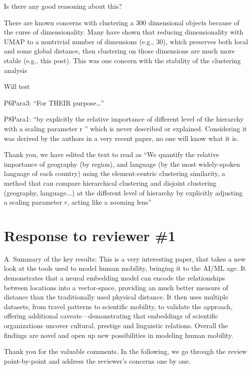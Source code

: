 \documentclass[12pt,a4paper]{article}
\newcommand{\response}[1]{{\leavevmode\noindent #1}}
\newcommand{\rcomment}[1]{%
\vspace{10pt}
\begin{tcolorbox}[colback=black!3,colframe=white!45!black]
#1
\end{tcolorbox}
}
\begin{document}
\response{
Is there any good reasoning about this?
}


\rcomment{
There are known concerns with clustering a 300 dimensional objects because of the curse of
dimensionality. Many have shown that reducing dimensionality with UMAP to a nontrivial
number of dimensions (e.g., 30), which preserves both local and some global distance, then
clustering on those dimensions are much more stable (e.g., this post). This was one
concern with the stability of the clustering analysis


}

\response{
Will test
}

\rcomment{
P6Para3: “For THEIR purpose…”
}

\response{
P8Para1: “by explicitly the relative importance of different level of the hierarchy with a scaling parameter r ” which is never described or explained. Considering it was derived by the authors in a very recent paper, no one will know what it is.
}

\rcomment{
Thank you, we have edited the text to read as “We quantify the relative importance of geography (by region), and language (by the most widely-spoken language of each country) using the element-centric clustering similarity, a method that can compare hierarchical clustering and disjoint clustering (geography, language...) at the different level of hierarchy by explicitly adjusting a scaling parameter $r$, acting like a zooming lens”
}



\section*{Response to reviewer \#1}

\rcomment{%
A. Summary of the key results:
This is a very interesting paper, that takes a new look at the tools used to model human mobility, bringing it to the AI/ML age. It demonstrates that a neural embedding model can encode the relationships between locations into a vector-space, providing an much better measure of distance than the traditionally used physical distance. It then uses multiple datasets, from travel patterns to scientific mobility, to validate the approach, offering additional caveats—demonstrating that embeddings of scientific organizations uncover cultural, prestige and linguistic relations. Overall the findings are novel and open up new possibilities in modeling human mobility.
}

\response{%
Thank you for the valuable comments. 
In the following, we go through the review point-by-point and address the reviewer's concerns one by one.
}
\end{document}
